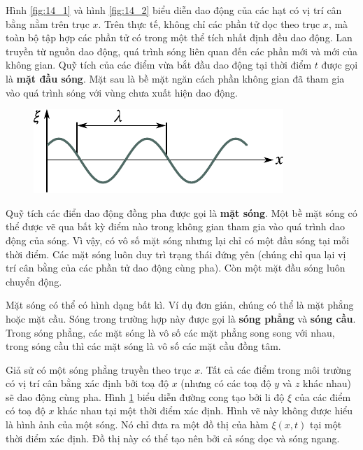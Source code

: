 Hình \ref{fig:14_1} và hình \ref{fig:14_2} biểu diễn dao động của các hạt có vị trí cân bằng nằm trên trục $x$. Trên thực tế, không chỉ các phần tử dọc theo trục $x$, mà toàn bộ tập hợp các phần tử có trong một thể tích nhất định đều dao động. Lan truyền từ nguồn dao động, quá trình sóng liên quan đến các phần mới và mới của không gian. Quỹ tích của các điểm vừa bắt đầu dao động tại thời điểm $t$ được gọi là \textbf{mặt đầu sóng}. Mặt sau là bề mặt ngăn cách phần không gian đã tham gia vào quá trình sóng với vùng chưa xuất hiện dao động.

\begin{figure}[!htb]
	\begin{center}
		\includegraphics[scale=1]{figures/ch_14/fig_14_3.pdf}
		\caption[]{}
		\label{fig:14_3}
	\end{center}
	\vspace{-0.85cm}
\end{figure}

Quỹ tích các điển dao động đồng pha được gọi là \textbf{mặt sóng}. Một bề mặt sóng có thể được vẽ qua bất kỳ điểm nào trong không gian tham gia vào quá trình dao động của sóng. Vì vậy, có vô số mặt sóng nhưng lại chỉ có một đầu sóng tại mỗi thời điểm. Các mặt sóng luôn duy trì trạng thái đứng yên (chúng chỉ qua lại vị trí cân bằng của các phần tử dao động cùng pha). Còn một mặt đầu sóng luôn chuyển động.

Mặt sóng có thể có hình dạng bất kì. Ví dụ đơn giản, chúng có thể là mặt phẳng hoặc mặt cầu. Sóng trong trường hợp này được gọi là \textbf{sóng phẳng} và \textbf{sóng cầu}. Trong sóng phẳng, các mặt sóng là vô số các mặt phẳng song song với nhau, trong sóng cầu thì các mặt sóng là vô số các mặt cầu đồng tâm.

Giả sử có một sóng phẳng truyền theo trục $x$. Tất cả các điểm trong môi trường có vị trí cân bằng xác định bởi toạ độ $x$ (nhưng có các toạ độ $y$ và $z$ khác nhau) sẽ dao động cùng pha. Hình \ref{fig:14_3} biểu diễn đường cong tạo bởi li độ $\xi$ của các điểm có toạ độ $x$ khác nhau tại một thời điểm xác định. Hình vẽ này không được hiểu là hình ảnh của một sóng. Nó chỉ đưa ra một đồ thị của hàm $\xi(x,t)$ tại một thời điểm xác định. Đồ thị này có thể tạo nên bởi cả sóng dọc và sóng ngang. 

